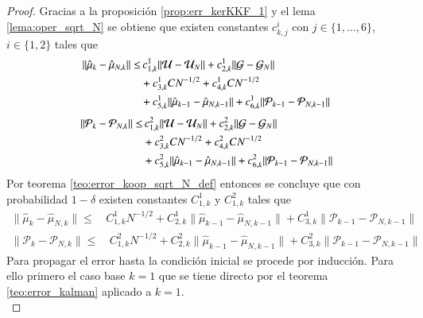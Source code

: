 \begin{proof}
	Gracias a la proposición \ref{prop:err_kerKKF_1} y el lema \ref{lema:oper_sqrt_N} se obtiene que existen constantes $c_{k,j}^i$ con $j \in \{ 1, \dots, 6\}$, $i \in \{ 1, 2\}$ tales que
	\begin{equation*}
		\begin{aligned}
			\| \hat \mu_{k} - \hat \mu_{N,k}  \| \leq & \, c_{1,k}^1 \| \mathcal{U} - \mathcal{U}_N \| +  c_{2,k}^1 \| \mathcal{G} - \mathcal{G}_N \| \\ 
			&+ c_{3,k}^1 C N^{-1/2}+c_{4,k}^1 C N^{-1/2} \\
			& + c_{5,k}^1 \| \hat \mu_{k-1} - \hat \mu_{N, k-1} \| + c_{6,k}^1 \| \mathcal{P}_{k-1} - \mathcal{P}_{N, k-1} \|
		\end{aligned}
		\label{}
	\end{equation*}
	\begin{equation*}
		\begin{aligned}
			\| \mathcal{P}_{k} - \mathcal{P}_{N,k} \| \leq & \, c_{1,k}^2 \| \mathcal{U} - \mathcal{U}_N \| +  c_{2,k}^2 \| \mathcal{G} - \mathcal{G}_N \| \\ 
			&+ c_{3,k}^2 C N^{-1/2}+c_{4,k}^2 C N^{-1/2} \\
			& + c_{5,k}^2 \| \hat \mu_{k-1} - \hat \mu_{N, k-1} \| + c_{6,k}^2 \| \mathcal{P}_{k-1} - \mathcal{P}_{N, k-1} \|
		\end{aligned}
	\end{equation*}
	Por teorema \ref{teo:error_koop_sqrt_N_def} entonces se concluye que con probabilidad $1-\delta$ existen constantes $C^1_{1, k}$ y $C^2_{1, k}$ tales que
	\begin{equation*}
		\begin{aligned}
			\| \hat \mu_{k} - \hat \mu_{N,k}  \| \leq & \, C_{1,k}^1 N^{-1/2} + C_{2,k}^1 \| \hat \mu_{k-1} - \hat \mu_{N, k-1} \| + C_{3,k}^1 \| \mathcal{P}_{k-1}  - \mathcal{P}_{N, k-1}  \|
		\end{aligned}
	\end{equation*}
	\begin{equation*}
		\begin{aligned}
			\| \mathcal{P}_{k} - \mathcal{P}_{N,k}  \| \leq & \, C_{1,k}^2 N^{-1/2} + C_{2,k}^2 \| \hat \mu_{k-1} - \hat \mu_{N, k-1} \| + C_{3,k}^2 \| \mathcal{P}_{k-1} - \mathcal{P}_{N,k-1} \|
		\end{aligned}
	\end{equation*}
	Para propagar el error hasta la condición inicial se procede por inducción. Para ello primero el caso base $k=1$ que se tiene directo por el teorema \ref{teo:error_kalman} aplicado a $k=1$.\\

\end{proof}
